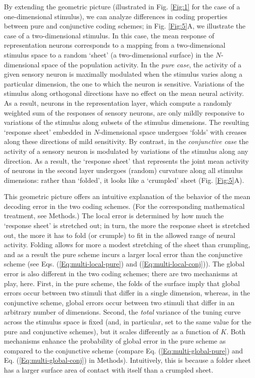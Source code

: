 \documentclass[a4paper]{article}%
\begin{document}
By extending the geometric picture (illustrated in Fig. \ref{Fig:1} for the
case of a one-dimensional stimulus), we can analyze differences in coding
properties between pure and conjunctive coding schemes; in Fig. \ref{Fig:5}A,
we illustrate the case of a two-dimensional stimulus. In this case, the mean
response of representation neurons corresponds to a mapping from a
two-dimensional stimulus space to a random `sheet' (a two-dimensional surface)
in the $N$-dimensional space of the population activity. In the \textit{pure
case}, the activity of a given sensory neuron is maximally modulated when the
stimulus varies along a particular dimension, the one to which the neuron is
sensitive. Variations of the stimulus along orthogonal directions have no
effect on the mean neural activity. As a result, neurons in the representation
layer, which compute a randomly weighted sum of the responses of sensory
neurons, are only mildly responsive to variations of the stimulus along
subsets of the stimulus dimensions. The resulting `response sheet' embedded in
$N$-dimensional space undergoes `folds' with creases along these directions of
mild sensitivity. By contrast, in the \textit{conjunctive case} the activity
of a sensory neuron is modulated by variations of the stimulus along any
direction. As a result, the `response sheet' that represents the joint mean
activity of neurons in the second layer undergoes (random) curvature along all
stimulus dimensions: rather than `folded', it looks like a `crumpled' sheet
(Fig. \ref{Fig:5}A).

This geometric picture offers an intuitive explanation of the behavior of the
mean decoding error in the two coding schemes. (For the corresponding
mathematical treatment, see Methods.) The local error is determined by how
much the `response sheet' is stretched out; in turn, the more the response
sheet is stretched out, the more it has to fold (or crumple) to fit in the
allowed range of neural activity. Folding allows for more a modest stretching
of the sheet than crumpling, and as a result the pure scheme incurs a larger
local error than the conjunctive scheme (see Eqs. (\ref{Eq:multi-local-pure})
and (\ref{Eq:multi-local-conj})). The global error is also different in the
two coding schemes; there are two mechanisms at play, here. First, in the pure
scheme, the folds of the surface imply that global errors occur between two
stimuli that differ in a single dimension, whereas, in the conjunctive scheme,
global errors occur between two stimuli that differ in an arbitrary number of
dimensions. Second, the \textit{total} variance of the tuning curve across the
stimulus space is fixed (and, in particular, set to the same value for the
pure and conjunctive schemes), but it scales differently as a function of $K$.
Both mechanisms enhance the probability of global error in the pure scheme as
compared to the conjunctive scheme (compare Eq. (\ref{Eq:multi-global-pure})
and Eq. (\ref{Eq:multi-global-conj}) in Methods). Intuitively, this is because
a folder sheet has a larger surface area of contact with itself than a
crumpled sheet.
\end{document}
